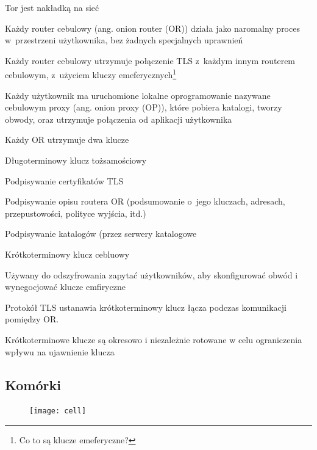 \begin{description}
  \begin{description}
   \item Tor jest nakładką na sieć
   \item Każdy router cebulowy (ang. onion router (OR)) działa jako naromalny proces w~przestrzeni użytkownika, bez żadnych specjalnych uprawnień
   \item Każdy router cebulowy utrzymuje połączenie TLS z~każdym innym routerem cebulowym, z~użyciem kluczy emeferycznych\footnote{Co to są klucze emeferyczne?}
   \item Każdy użytkownik ma uruchomione lokalne oprogramowanie nazywane cebulowym proxy (ang. onion proxy (OP)), które pobiera katalogi, tworzy obwody, oraz utrzymuje połączenia od aplikacji użytkownika
   \item Każdy OR utrzymuje dwa klucze
   \begin{description}
    \item Długoterminowy klucz tożsamościowy
    \begin{description}
     \item Podpisywanie certyfikatów TLS
     \item Podpisywanie opisu routera OR (podsumowanie o~jego kluczach, adresach, przepustowości, polityce wyjścia, itd.)
     \item Podpisywanie katalogów (przez serwery katalogowe
    \end{description}

    \item Krótkoterminowy klucz cebluowy
    \begin{description}
     \item Używany do odszyfrowania zapytać użytkowników, aby skonfigurować obwód i wynegocjować klucze emfiryczne
    \end{description}
    \item Protokół TLS ustanawia krótkoterminowy klucz łącza podczas komunikacji pomiędzy OR.
    \item Krótkoterminowe klucze są okresowo i niezależnie rotowane w celu ograniczenia wpływu na ujawnienie klucza

   \end{description}
   
  \end{description}

\end{description}


\subsection{Komórki}
   \begin{figure}
    \texttt{[image: cell]}
    
   \end{figure}

